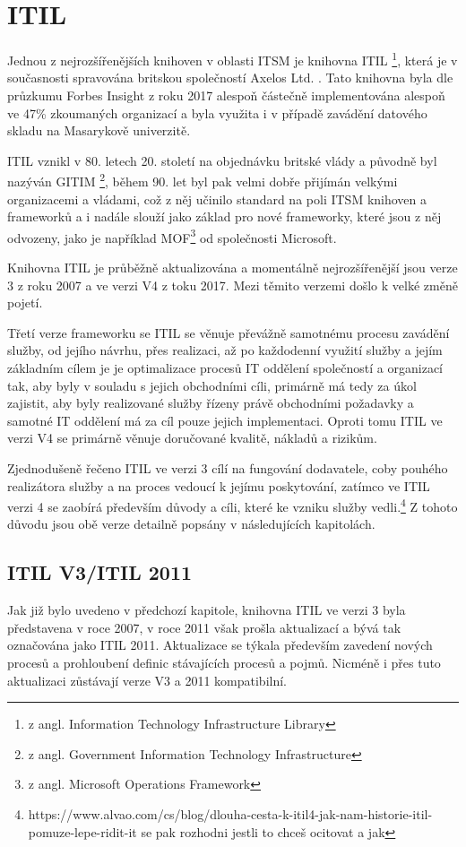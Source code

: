 \documentclass[
  digital,     %
  twoside,     %
  lof,         %
  lot,         %
]{fithesis4}
\begin{document}
\section{ITIL}
Jednou z nejrozšířenějších knihoven v oblasti ITSM je knihovna ITIL \footnote{z angl. Information Technology Infrastructure Library}, která je v současnosti spravována britskou společností Axelos Ltd. \parencite[s.~31]{Matula2017}. Tato knihovna byla dle průzkumu Forbes Insight z roku 2017 alespoň částečně implementována alespoň ve 47\% zkoumaných organizací\parencite{Watts3082017} a byla využita i v případě zavádění datového skladu na Masarykově univerzitě. 

ITIL vznikl v 80. letech 20. století na objednávku britské vlády a původně byl nazýván GITIM \footnote{z angl. Government Information Technology Infrastructure}, během 90. let byl pak velmi dobře přijímán velkými organizacemi a vládami, což z něj učinilo standard na poli ITSM knihoven a frameworků a i nadále slouží jako základ pro nové frameworky, které jsou z něj odvozeny, jako je například MOF\footnote{z angl. Microsoft Operations Framework} od společnosti Microsoft. \parencite[s. ~31]{Matula2017}

Knihovna ITIL je průběžně aktualizována a momentálně nejrozšířenější jsou verze 3 z roku 2007 a ve verzi V4 z toku 2017. Mezi těmito verzemi došlo k velké změně pojetí. 

Třetí verze frameworku se ITIL se věnuje převážně samotnému procesu zavádění služby, od jejího návrhu, přes realizaci, až po každodenní využití služby a jejím základním cílem je je optimalizace procesů IT oddělení společností a organizací tak, aby byly v souladu s jejich obchodními cíli, primárně má tedy za úkol zajistit, aby byly realizované služby řízeny právě obchodními požadavky a samotné IT oddělení má za cíl pouze jejich implementaci.\parencite[s.~8]{Carlidge2007} Oproti tomu ITIL ve verzi V4 se primárně věnuje doručované kvalitě, nákladů a rizikům. 

Zjednodušeně řečeno ITIL ve verzi 3 cílí na fungování dodavatele, coby pouhého realizátora služby a na proces vedoucí k jejímu poskytování, zatímco ve ITIL verzi 4 se zaobírá především důvody a cíli, které ke vzniku služby vedli.\footnote{https://www.alvao.com/cs/blog/dlouha-cesta-k-itil4-jak-nam-historie-itil-pomuze-lepe-ridit-it se pak rozhodni jestli to chceš ocitovat a jak}
Z tohoto důvodu jsou obě verze detailně popsány v následujících kapitolách.  
\subsection{ITIL V3/ITIL 2011}
Jak již bylo uvedeno v předchozí kapitole, knihovna ITIL ve verzi 3 byla představena v roce 2007, v roce 2011 však prošla aktualizací a bývá tak označována jako ITIL 2011. Aktualizace se týkala především zavedení nových procesů a prohloubení definic stávajících procesů a pojmů. Nicméně i přes tuto aktualizaci zůstávají verze V3 a 2011 kompatibilní.\parencite{Kempter2722013}
\end{document}
